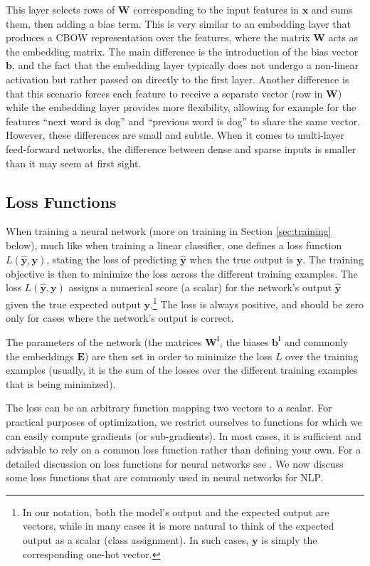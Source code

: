 \documentclass[jair,twoside,11pt,theapa]{article}
\newcommand{\m}[1]{\mathbf{#1}}%
\begin{document}
{This layer selects rows of $\m{W}$ corresponding to the input features in
$\m{x}$ and sums them, then adding a bias term.  This is very similar to
an embedding layer that produces a CBOW representation over the features,
where the matrix $\m{W}$ acts as the embedding matrix.  The main difference
is the introduction of the bias vector $\m{b}$, and the fact that the embedding
layer typically does not undergo a non-linear activation but rather passed on
directly to the first layer. Another difference is that this scenario forces
each feature to receive a separate vector (row in $\m{W}$) while the embedding
layer provides more flexibility, allowing for example for the features ``next
word is dog'' and ``previous word is dog'' to share the same vector. However,
these differences are small and subtle. When it comes to multi-layer
feed-forward networks, the difference between dense and sparse inputs
is smaller than it may seem at first sight.

\subsection{Loss Functions}

When training a neural network (more on training in Section \ref{sec:training} below),
much like when training a linear classifier, 
one defines a loss function $L(\m{\hat{y}},\m{y})$, stating the loss of
predicting $\m{\hat{y}}$ when the true output is $\m{y}$.  The training
objective is then to minimize the loss across the different training examples.
The loss $L(\m{\hat{y}},\m{y})$ assigns a numerical score (a scalar) for the
network's output $\m{\hat{y}}$ given the true expected output
$\m{y}$.\footnote{In our notation, both the model's output and the expected
output are vectors, while in many cases it is more natural to think of the
expected output as a scalar (class assignment). In such cases, $\m{y}$ is simply
the corresponding one-hot vector.} The loss is always positive, and should be
zero only for cases where the network's output is correct.

The parameters of the network (the matrices $\m{W^i}$, the biases $\m{b^i}$ and
commonly the embeddings $\m{E}$) are then set in order to minimize the loss $L$
over the training examples (usually, it is the sum of the losses over the
different training examples that is being minimized).

The loss can be an arbitrary function mapping two vectors to a scalar. For
practical purposes of optimization, we restrict ourselves to functions for which
we can easily compute gradients (or sub-gradients).  In most cases, it is
sufficient and advisable to rely on a common loss function rather than defining
your own.  For a detailed discussion on loss functions for neural networks see
\cite{lecun2006tutorial,lecun2005loss,bengio2015deep}.
We now discuss some loss functions that are commonly used in neural networks for
NLP.

}
\end{document}
